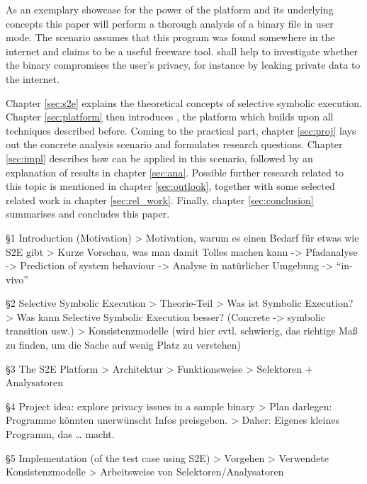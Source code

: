 \bigskip

As an exemplary showcase for the power of the \sse platform and its underlying concepts this paper will perform a thorough analysis of a binary file in user mode.
The scenario assumes that this program was found somewhere in the internet and claims to be a useful freeware tool.
\sse shall help to investigate whether the binary compromises the user's privacy, for instance by leaking private data to the internet.



\bigskip

Chapter \ref{sec:s2e} explains the theoretical concepts of selective symbolic execution.
Chapter \ref{sec:platform} then introduces \sse, the platform which builds upon all techniques described before.
Coming to the practical part, chapter \ref{sec:proj} lays out the concrete analysis scenario and formulates research questions.
Chapter \ref{sec:impl} describes how \sse can be applied in this scenario, followed by an explanation of \sse results in chapter \ref{sec:ana}.
Possible further research related to this topic is mentioned in chapter \ref{sec:outlook}, together with some selected related work in chapter \ref{sec:rel_work}.
Finally, chapter \ref{sec:conclusion} summarises and concludes this paper.

\iffalse
§1	Introduction (Motivation)
		> Motivation, warum es einen Bedarf für etwas wie S2E gibt
		> Kurze Vorschau, was man damit Tolles machen kann
			-> Pfadanalyse -> Prediction of system behaviour
			-> Analyse in natürlicher Umgebung -> “in-vivo”

§2	Selective Symbolic Execution
		> Theorie-Teil
		> Was ist Symbolic Execution?
		> Was kann Selective Symbolic Execution besser?
			(Concrete -> symbolic transition usw.)
		> Konsistenzmodelle (wird hier evtl. schwierig, das richtige Maß 
			zu finden, um die Sache auf wenig Platz zu verstehen)

§3	The S2E Platform
		> Architektur
		> Funktionsweise
		> Selektoren + Analysatoren

§4	Project idea: explore privacy issues in a sample binary
		> Plan darlegen: Programme könnten unerwünscht Infos preisgeben.
		> Daher: Eigenes kleines Programm, das … macht.

§5 	Implementation (of the test case using S2E)
		> Vorgehen
		> Verwendete Konsistenzmodelle
		> Arbeitsweise von Selektoren/Analysatoren

